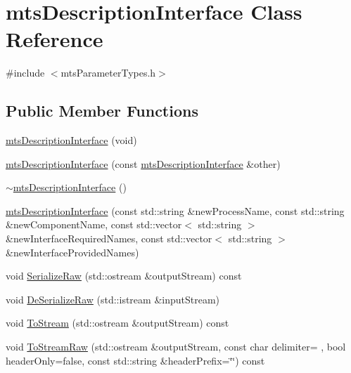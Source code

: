 \hypertarget{classmts_description_interface}{}\section{mts\+Description\+Interface Class Reference}
\label{classmts_description_interface}


{\ttfamily \#include $<$mts\+Parameter\+Types.\+h$>$}

\subsection*{Public Member Functions}
\begin{DoxyCompactItemize}
\item 
\hyperlink{classmts_description_interface_ae4a67d275887332e608bdc9b102c46a9}{mts\+Description\+Interface} (void)
\item 
\hyperlink{classmts_description_interface_a5f4792933faa2eb276b2a6464eea2e92}{mts\+Description\+Interface} (const \hyperlink{classmts_description_interface}{mts\+Description\+Interface} \&other)
\item 
\hyperlink{classmts_description_interface_a931dae8a283c689a6c0211aee58d0654}{$\sim$mts\+Description\+Interface} ()
\item 
\hyperlink{classmts_description_interface_a95fccf272e167823ea539844eb2ea0e0}{mts\+Description\+Interface} (const std\+::string \&new\+Process\+Name, const std\+::string \&new\+Component\+Name, const std\+::vector$<$ std\+::string $>$ \&new\+Interface\+Required\+Names, const std\+::vector$<$ std\+::string $>$ \&new\+Interface\+Provided\+Names)
\item 
void \hyperlink{classmts_description_interface_ac3c31284ba77cd2e81295fe985909e3e}{Serialize\+Raw} (std\+::ostream \&output\+Stream) const 
\item 
void \hyperlink{classmts_description_interface_a73e47d634d5de6c0963fb5ce2cd70577}{De\+Serialize\+Raw} (std\+::istream \&input\+Stream)
\item 
void \hyperlink{classmts_description_interface_a6ac57169fc191987e0b6ece45379c6af}{To\+Stream} (std\+::ostream \&output\+Stream) const 
\item 
void \hyperlink{classmts_description_interface_a7b6c091d3a3f83c67e205118230b1355}{To\+Stream\+Raw} (std\+::ostream \&output\+Stream, const char delimiter= \textquotesingle{} \textquotesingle{}, bool header\+Only=false, const std\+::string \&header\+Prefix=\char`\"{}\char`\"{}) const 

\end{DoxyCompactItemize}

